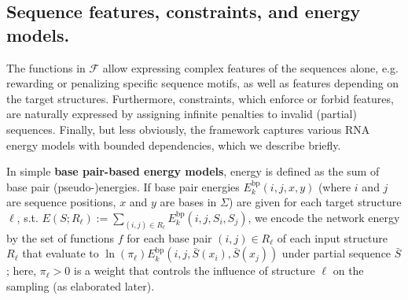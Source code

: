 \documentclass{bioinfo}
\newcommand{\network}{\mathcal{N}}
\newcommand{\val}{\bar S} %
\newcommand{\energy}[1]{\operatorname{e}_{#1}}
\newcommand{\F}{\mathcal{F}}
\newcommand{\Ebp}[2]{E^{\textrm{bp}}_{#1}(#2)}
\newcommand{\Ehp}[1]{E^{\textrm{hp}}(#1)}
\newcommand{\Eint}[1]{E^{\textrm{int}}(#1)}
\newcommand{\Def}[1]{{\bfseries #1}}
\begin{document}
\subsection{Sequence features, constraints, and energy
  models.}\label{sec:energy_models}

The functions in $\F$ allow expressing complex features of the
sequences alone, e.g. rewarding or penalizing specific sequence
motifs, as well as features depending on the target structures.
Furthermore, constraints, which enforce or forbid features, are
naturally expressed by assigning infinite penalties to invalid
(partial) sequences. Finally, but less obviously, the framework
captures various RNA energy models with bounded dependencies, which we
describe briefly.

In simple \Def{base pair-based energy models}, energy is defined as
the sum of base pair (pseudo-)energies. If base pair energies
$\Ebp{k}{i,j,x,y}$ (where $i$ and $j$ are sequence positions, $x$ and
$y$ are bases in $\Sigma$) are given for each target structure $\ell$,
s.t.  $ E(S;R_\ell) := \sum_{(i,j)\in R_\ell} \Ebp{k}{i,j,S_i,S_j}$,
we encode the network energy by the set of functions $f$ for each base
pair $(i,j)\in R_\ell$ of each input structure $R_\ell$ that evaluate
to $\ln(\pi_\ell) \Ebp{k}{i,j,\val(x_i),\val(x_j)}$ under partial sequence $\val$;
here, $\pi_\ell>0$ is a weight that controls the
influence of structure $\ell$ on the sampling (as elaborated later).

\end{document}
